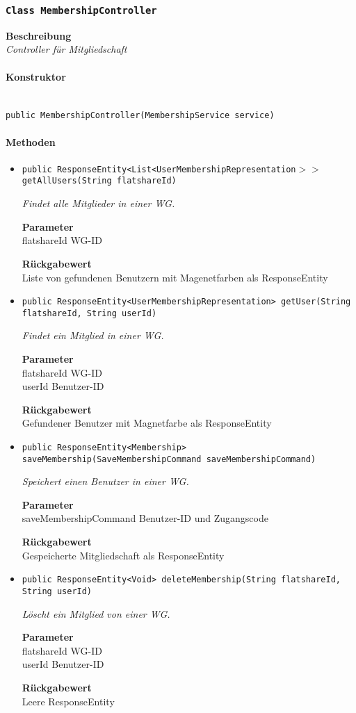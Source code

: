      \subsubsection{\texttt{Class MembershipController}}
     \textbf{Beschreibung} \\
     \textit{Controller für Mitgliedschaft}
     \paragraph*{Konstruktor}\mbox{} \\
     \texttt{public MembershipController(MembershipService service)} \\
     \paragraph*{Methoden}
     \begin{itemize}
     	\item{\texttt{public ResponseEntity<List<UserMembershipRepresentation$>>$ getAllUsers(String flatshareId)}}
     	
     	\textit{Findet alle Mitglieder in einer WG.}
     	
     	\textbf{Parameter} \\
     	flatshareId WG-ID
     	
     	\textbf{Rückgabewert} \\
     	Liste von gefundenen Benutzern mit Magenetfarben als ResponseEntity        \item{\texttt{public ResponseEntity<UserMembershipRepresentation> getUser(String flatshareId, String userId)}}
     	
     	\textit{Findet ein Mitglied in einer WG.}
     	
     	\textbf{Parameter} \\
     	flatshareId WG-ID\\
     	userId Benutzer-ID
     	
     	\textbf{Rückgabewert} \\
     	Gefundener Benutzer mit Magnetfarbe als ResponseEntity        \item{\texttt{public ResponseEntity<Membership> saveMembership(SaveMembershipCommand saveMembershipCommand)}}
     	
     	\textit{Speichert einen Benutzer in einer WG.}
     	
     	\textbf{Parameter} \\
     	saveMembershipCommand Benutzer-ID und Zugangscode
     	
     	\textbf{Rückgabewert} \\
     	Gespeicherte Mitgliedschaft als ResponseEntity        \item{\texttt{public ResponseEntity<Void> deleteMembership(String flatshareId, String userId)}}
     	
     	\textit{Löscht ein Mitglied von einer WG.}
     	
     	\textbf{Parameter} \\
     	flatshareId WG-ID\\
     	userId Benutzer-ID
     	
     	\textbf{Rückgabewert} \\
     	Leere ResponseEntity
     \end{itemize}
